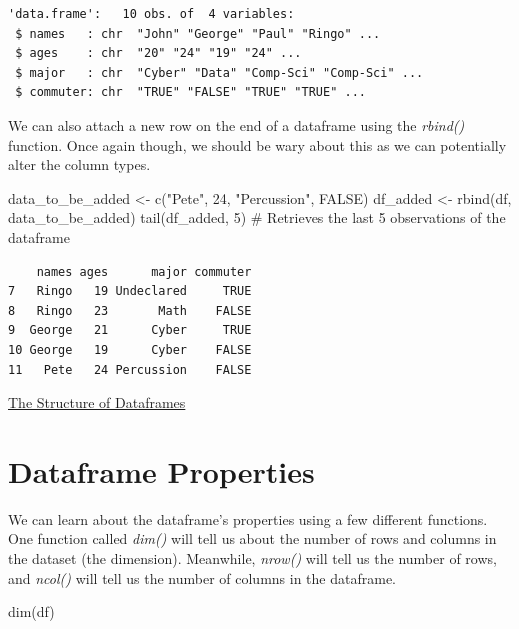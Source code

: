 \documentclass[
  letterpaper,
  DIV=11,
  numbers=noendperiod]{scrreprt}
\newenvironment{Shaded}{\begin{snugshade}}{\end{snugshade}}
\newcommand{\CommentTok}[1]{\textcolor[rgb]{0.37,0.37,0.37}{#1}}
\newcommand{\ConstantTok}[1]{\textcolor[rgb]{0.56,0.35,0.01}{#1}}
\newcommand{\DecValTok}[1]{\textcolor[rgb]{0.68,0.00,0.00}{#1}}
\newcommand{\FunctionTok}[1]{\textcolor[rgb]{0.28,0.35,0.67}{#1}}
\newcommand{\NormalTok}[1]{\textcolor[rgb]{0.00,0.23,0.31}{#1}}
\newcommand{\OtherTok}[1]{\textcolor[rgb]{0.00,0.23,0.31}{#1}}
\newcommand{\StringTok}[1]{\textcolor[rgb]{0.13,0.47,0.30}{#1}}
\begin{document}
\begin{verbatim}
'data.frame':   10 obs. of  4 variables:
 $ names   : chr  "John" "George" "Paul" "Ringo" ...
 $ ages    : chr  "20" "24" "19" "24" ...
 $ major   : chr  "Cyber" "Data" "Comp-Sci" "Comp-Sci" ...
 $ commuter: chr  "TRUE" "FALSE" "TRUE" "TRUE" ...
\end{verbatim}

We can also attach a new row on the end of a dataframe using the
\emph{rbind()} function. Once again though, we should be wary about this
as we can potentially alter the column types.

\begin{Shaded}
\begin{Highlighting}[]
\NormalTok{data\_to\_be\_added }\OtherTok{\textless{}{-}} \FunctionTok{c}\NormalTok{(}\StringTok{"Pete"}\NormalTok{, }\DecValTok{24}\NormalTok{, }\StringTok{"Percussion"}\NormalTok{, }\ConstantTok{FALSE}\NormalTok{)}
\NormalTok{df\_added }\OtherTok{\textless{}{-}} \FunctionTok{rbind}\NormalTok{(df, data\_to\_be\_added)}
\FunctionTok{tail}\NormalTok{(df\_added, }\DecValTok{5}\NormalTok{) }\CommentTok{\# Retrieves the last 5 observations of the dataframe}
\end{Highlighting}
\end{Shaded}

\begin{verbatim}
    names ages      major commuter
7   Ringo   19 Undeclared     TRUE
8   Ringo   23       Math    FALSE
9  George   21      Cyber     TRUE
10 George   19      Cyber    FALSE
11   Pete   24 Percussion    FALSE
\end{verbatim}

\begin{watch}{}{}
    \href{https://youtu.be/0BlLEFou1kM}{The Structure of Dataframes}
\end{watch}

\section{Dataframe Properties}\label{dataframe-properties}

We can learn about the dataframe's properties using a few different
functions. One function called \emph{dim()} will tell us about the
number of rows and columns in the dataset (the dimension). Meanwhile,
\emph{nrow()} will tell us the number of rows, and \emph{ncol()} will
tell us the number of columns in the dataframe.

\begin{Shaded}
\begin{Highlighting}[]
\FunctionTok{dim}\NormalTok{(df)}
\end{Highlighting}
\end{Shaded}
\end{document}
